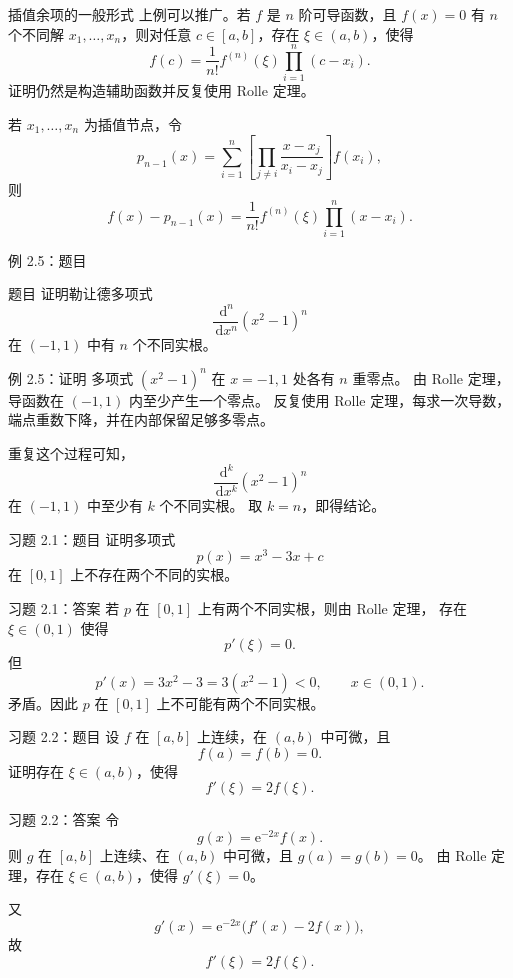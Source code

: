 \documentclass[aspectratio=169,10pt]{ctexbeamer}
\newcommand{\ee}{\mathrm{e}}
\newcommand{\dd}{\,\mathrm{d}}
\begin{document}
\begin{frame}{插值余项的一般形式}
\footnotesize
上例可以推广。若 $f$ 是 $n$ 阶可导函数，且 $f(x)=0$ 有 $n$ 个不同解
$x_1,\ldots,x_n$，则对任意 $c\in[a,b]$，存在 $\xi\in(a,b)$，使得
\[
  f(c)=\frac1{n!}f^{(n)}(\xi)\prod_{i=1}^{n}(c-x_i).
\tag{2.1}
\]
证明仍然是构造辅助函数并反复使用 Rolle 定理。

若 $x_1,\ldots,x_n$ 为插值节点，令
\[
  p_{n-1}(x)=
  \sum_{i=1}^{n}\left[
  \prod_{j\ne i}\frac{x-x_j}{x_i-x_j}
  \right]f(x_i),
\]
则
\[
  f(x)-p_{n-1}(x)
  =\frac1{n!}f^{(n)}(\xi)\prod_{i=1}^{n}(x-x_i).
\tag{2.2}
\]
\end{frame}

\begin{frame}{例 2.5：题目}
\small
\begin{block}{题目}
证明勒让德多项式
\[
  \frac{\dd^n}{\dd x^n}(x^2-1)^n
\]
在 $(-1,1)$ 中有 $n$ 个不同实根。
\end{block}
\end{frame}

\begin{frame}{例 2.5：证明}
\small
多项式 $(x^2-1)^n$ 在 $x=-1,1$ 处各有 $n$ 重零点。
由 Rolle 定理，导函数在 $(-1,1)$ 内至少产生一个零点。
反复使用 Rolle 定理，每求一次导数，端点重数下降，并在内部保留足够多零点。

重复这个过程可知，
\[
  \frac{\dd^k}{\dd x^k}(x^2-1)^n
\]
在 $(-1,1)$ 中至少有 $k$ 个不同实根。
取 $k=n$，即得结论。
\end{frame}

\begin{frame}{习题 2.1：题目}
\small
证明多项式
\[
  p(x)=x^3-3x+c
\]
在 $[0,1]$ 上不存在两个不同的实根。
\end{frame}

\begin{frame}{习题 2.1：答案}
\small
若 $p$ 在 $[0,1]$ 上有两个不同实根，则由 Rolle 定理，
存在 $\xi\in(0,1)$ 使得
\[
  p'(\xi)=0.
\]
但
\[
  p'(x)=3x^2-3=3(x^2-1)<0,\qquad x\in(0,1).
\]
矛盾。因此 $p$ 在 $[0,1]$ 上不可能有两个不同实根。
\end{frame}

\begin{frame}{习题 2.2：题目}
\small
设 $f$ 在 $[a,b]$ 上连续，在 $(a,b)$ 中可微，且
\[
  f(a)=f(b)=0.
\]
证明存在 $\xi\in(a,b)$，使得
\[
  f'(\xi)=2f(\xi).
\]
\end{frame}

\begin{frame}{习题 2.2：答案}
\small
令
\[
  g(x)=\ee^{-2x}f(x).
\]
则 $g$ 在 $[a,b]$ 上连续、在 $(a,b)$ 中可微，且 $g(a)=g(b)=0$。
由 Rolle 定理，存在 $\xi\in(a,b)$，使得 $g'(\xi)=0$。

又
\[
  g'(x)=\ee^{-2x}\bigl(f'(x)-2f(x)\bigr),
\]
故
\[
  f'(\xi)=2f(\xi).
\]
\end{frame}
\end{document}
